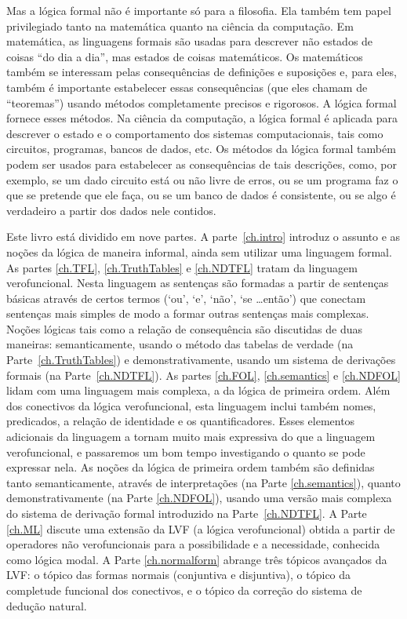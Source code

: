 

Mas a lógica formal não é importante só para a filosofia.
Ela também tem papel privilegiado tanto na matemática quanto na ciência da computação.
Em matemática, as linguagens formais são usadas para descrever não estados de coisas ``do dia a dia'', mas estados de coisas matemáticos.
Os matemáticos também se interessam pelas consequências de definições e suposições e, para eles, também é importante estabelecer essas consequências (que eles chamam de ``teoremas'') usando métodos completamente precisos e rigorosos.
A lógica formal fornece esses métodos.
Na ciência da computação, a lógica formal é aplicada para descrever o estado e o comportamento dos sistemas computacionais, tais como circuitos, programas, bancos de dados, etc.
Os métodos da lógica formal também podem ser usados para estabelecer as consequências de tais descrições, como, por exemplo, se um dado circuito está ou não livre de erros, ou se um programa faz o que se pretende que ele faça, ou se um banco de dados é consistente, ou se algo é verdadeiro a partir dos dados nele contidos.

Este livro está dividido em nove partes.
A parte~\ref{ch.intro} introduz o assunto e as noções da lógica de maneira informal, ainda sem utilizar uma linguagem formal.
As partes \ref{ch.TFL}, \ref{ch.TruthTables} e \ref{ch.NDTFL} tratam da linguagem verofuncional.  Nesta linguagem as sentenças são formadas a partir de sentenças básicas através de certos termos (`ou', `e', `não', `se \dots então') que conectam sentenças mais simples de modo a formar outras sentenças mais complexas.
Noções lógicas tais como a relação de consequência são discutidas de duas maneiras:
semanticamente, usando o método das tabelas de verdade (na Parte~\ref{ch.TruthTables}) e demonstrativamente, usando um sistema de derivações formais (na Parte~\ref{ch.NDTFL}).
As partes \ref{ch.FOL}, \ref{ch.semantics} e \ref{ch.NDFOL} lidam com uma linguagem mais complexa, a da lógica de primeira ordem.
Além dos conectivos da lógica verofuncional, esta linguagem inclui também nomes, predicados, a relação de identidade e os quantificadores.
Esses elementos adicionais da linguagem a tornam muito mais expressiva do que a linguagem verofuncional, e passaremos um bom tempo investigando o quanto se pode expressar nela.
As noções da lógica de primeira ordem também são definidas tanto semanticamente, através de interpretações (na Parte \ref{ch.semantics}), quanto demonstrativamente (na Parte \ref{ch.NDFOL}), usando uma versão mais complexa do sistema de derivação formal introduzido na Parte~\ref{ch.NDTFL}.
A Parte \ref{ch.ML} discute uma extensão da LVF (a lógica verofuncional) obtida a partir de operadores não verofuncionais para a possibilidade e a necessidade, conhecida como lógica modal.
A Parte \ref{ch.normalform} abrange três tópicos avançados da LVF:
o tópico das formas normais (conjuntiva e disjuntiva), o tópico da completude funcional dos conectivos, e o tópico da correção do sistema de dedução natural.

